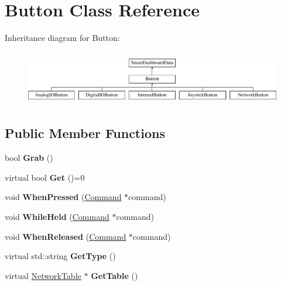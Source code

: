 \hypertarget{classButton}{
\section{Button Class Reference}
\label{classButton}
}
Inheritance diagram for Button:\begin{figure}[H]
\begin{center}
\leavevmode
\includegraphics[height=2.400000cm]{classButton}
\end{center}
\end{figure}
\subsection*{Public Member Functions}
\begin{DoxyCompactItemize}
\item 
\hypertarget{classButton_af6127e87c28b711ec8b081ba543f376d}{
bool {\bfseries Grab} ()}
\label{classButton_af6127e87c28b711ec8b081ba543f376d}

\item 
\hypertarget{classButton_a8f887212b6fdb7a207f5c9a69f4e869a}{
virtual bool {\bfseries Get} ()=0}
\label{classButton_a8f887212b6fdb7a207f5c9a69f4e869a}

\item 
\hypertarget{classButton_ac39c74ffd8cf1a11fac01e06fdc739ce}{
void {\bfseries WhenPressed} (\hyperlink{classCommand}{Command} $\ast$command)}
\label{classButton_ac39c74ffd8cf1a11fac01e06fdc739ce}

\item 
\hypertarget{classButton_ac1d054c959b847d06acc69ddd03001bf}{
void {\bfseries WhileHeld} (\hyperlink{classCommand}{Command} $\ast$command)}
\label{classButton_ac1d054c959b847d06acc69ddd03001bf}

\item 
\hypertarget{classButton_a2e171adcbeb70183811e4e4d512074c3}{
void {\bfseries WhenReleased} (\hyperlink{classCommand}{Command} $\ast$command)}
\label{classButton_a2e171adcbeb70183811e4e4d512074c3}

\item 
\hypertarget{classButton_aeb090254799084ef8a9d89c85beba4eb}{
virtual std::string {\bfseries GetType} ()}
\label{classButton_aeb090254799084ef8a9d89c85beba4eb}

\item 
\hypertarget{classButton_af52146d4919f8e6adde2a1e07dcdd28a}{
virtual \hyperlink{classNetworkTable}{NetworkTable} $\ast$ {\bfseries GetTable} ()}
\label{classButton_af52146d4919f8e6adde2a1e07dcdd28a}

\end{DoxyCompactItemize}
